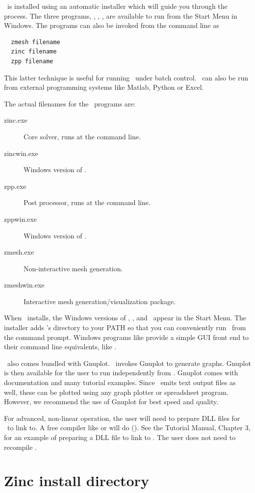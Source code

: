 \documentclass[a4paper,twoside,11pt]{book}
\begin{document}
\zinc\ is installed using an automatic installer which will guide you
through the process. The three programs, \zmesh, \zinc, \zpp, are
available to run from the Start Menu in Windows. The programs can also
be invoked from the command line as
\begin{verbatim}
  zmesh filename
  zinc filename
  zpp filename
\end{verbatim}
This latter technique is useful for running \zinc\ under batch
control. \zinc\ can also be run from external programming systems like
Matlab, Python or Excel.

The actual filenames for the \zinc\ programs are:
\begin{description}
  \item[zinc.exe] Core solver, runs at the command line.
  \item[zincwin.exe] Windows version of \zinc.
  \item[zpp.exe] Post processor, runs at the command line.
  \item[zppwin.exe] Windows version of \zpp.
  \item[zmesh.exe] Non-interactive mesh generation.
  \item[zmeshwin.exe] Interactive mesh generation/visualization package.
\end{description}

When \zinc\ installs, the Windows versions of \zmesh, \zinc, and
\zpp\ appear in the Start Menu. The installer adds \zinc's directory
to your PATH so that you can conveniently run \zinc\ from the command
prompt. Windows programs like  provide a simple GUI front
end to their command line equivalents, like .

\zinc\ also comes bundled with Gnuplot. \zpp\ invokes Gnuplot to
generate graphs. Gnuplot is then available for the user to run
independently from \zinc. Gnuplot comes with documentation and many
tutorial examples. Since \zpp\ emits text output files as well, these
can be plotted using any graph plotter or spreadsheet
program. However, we recommend the use of Gnuplot for best speed and
quality.

For advanced, non-linear operation, the user will need to prepare DLL
files for \zinc\ to link to. A free compiler like  or
 will do ().  See
the Tutorial Manual, Chapter 3, for an example of preparing a DLL file
to link to \zinc. The user does not need to recompile \zinc.

\section{Zinc install directory}
\end{document}
